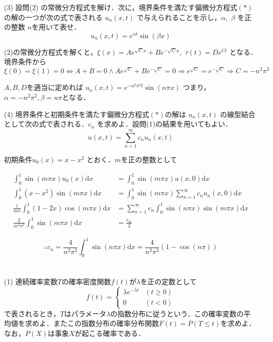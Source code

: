 \documentclass[a4j]{jarticle}
\begin{document}
\begin{screen}
 (3) 設問(2) の常微分方程式を解け．次に，境界条件を満たす偏微分方程式$(\ast)$の解の一つが次の式で表される $u_n(x,t)$ で与えられることを示し，$\alpha,$ $\beta$ を正の整数 $n$を用いて表せ．
 $$u_n(x,t) = e^{\alpha t}\sin(\beta x)$$
\end{screen}

(2)の常微分方程式を解くと，$\xi(x) = Ae^{\sqrt{C}x}+Be^{-\sqrt{C}x},$ $\tau(t) = De^{Ct}$ となる．境界条件から$\xi(0)=\xi(1)=0 \Leftrightarrow A+B=0 \land Ae^{\sqrt{C}}+Be^{-\sqrt{C}} = 0 \Rightarrow e^{\sqrt{C}}=e^{-\sqrt{C}} \Rightarrow C=-n^2\pi^2$

$A,B,D$を適当に定めれば $u_n(x,t) = e^{-n^2\pi^2 t} \sin(n \pi x)$ つまり，$\alpha = -n^2\pi^2, \beta = n \pi$となる．

\begin{screen}
 (4) 境界条件と初期条件を満たす偏微分方程式$(\ast)$の解は $u_n(x,t)$ の線型結合として次の式で表される．$c_n$ を求めよ．設問(1)の結果を用いてもよい．
 $$u(x,t) = \sum_{n=1}^\infty c_n u_n (x,t)$$
\end{screen}

初期条件$u_0 (x) = x-x^2$ とおく．$m$を正の整数として

\begin{align*}
 \int_0^1 \sin(m \pi x)u_0(x) \mathrm{d} x&=  \int_0^1 \sin(m \pi x)u(x,0) \mathrm{d} x \\
 \int_0^1 (x-x^2)\sin(m \pi x) \mathrm{d} x&=  \int_0^1 \sin(m \pi x)\sum_{n=1}^\infty c_n u_n(x,0) \mathrm{d} x \\
 \frac{1}{m\pi} \int_0^1(1-2x)\cos(m \pi x) \mathrm{d}x &= \sum_{n=1}^\infty c_n \int_0^1 \sin(n \pi x) \sin( m \pi x) \mathrm{d} x \\
 \frac{2}{m^2\pi^2}\int_0^1 \sin(m \pi x)\mathrm{d}x&= \frac{c_m}{2}
\end{align*}

$$ \therefore c_n = \frac{4}{n^2\pi^2}\int_0^1 \sin(n \pi x)\mathrm{d}x = \frac{4}{n^3\pi^3}(1-\cos(n \pi))$$

\section{}

\begin{screen}
 (1) 連続確率変数$T$の確率密度関数$f(t)$が$\lambda$を正の定数として
 $$f(t)=\begin{cases}
         \lambda e^{-\lambda t} & (t\geq 0) \\
         0 & (t<0)
        \end{cases}$$
 で表されるとき，$T$はパラメータ$\lambda$の指数分布に従うという．この確率変数の平均値を求めよ．またこの指数分布の確率分布関数$F(t)=P(T \leq t)$を求めよ．なお，$P(X)$は事象$X$が起こる確率である．
\end{screen}
\end{document}
